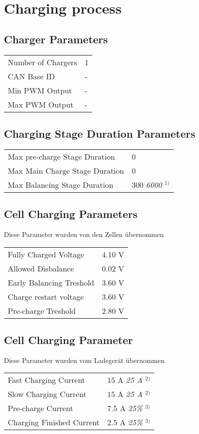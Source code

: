 \section*{Charging process}
\subsection*{Charger Parameters}
\begin{tabular}{p{11cm}p{2cm}}
	Number of Chargers & 1 \\
	CAN Base ID & - \\
	Min PWM Output & - \\
	Max PWM Output & -
\end{tabular}
\subsection*{Charging Stage Duration Parameters}
\begin{tabular}{p{11cm}p{2cm}}
	Max pre-charge Stage Duration & 0 \\
	Max Main Charge Stage Duration & 0 \\
	Max Balancing Stage Duration & 300 \textit{6000 $^{1)}$}
\end{tabular}
\subsection*{Cell Charging Parameters}
Diese Parameter wurden von den Zellen übernommen \cite{lev50}\\
\begin{tabular}{p{11cm}p{2cm}}
	Fully Charged Voltage & $4.10$ V \\
	Allowed Disbalance & $0.02$ V \\
	Early Balancing Treshold & $3.60$ V \\
	Charge restart voltage & $3.60$ V \\
	Pre-charge Treshold & $2.80$ V
\end{tabular}
\subsection*{Cell Charging Parameter}
Diese Parameter wurden vom Ladegerät übernommen \cite{ladegeraet}\\
\begin{tabular}{p{11cm}p{3cm}}
	Fast Charging Current & $15$ A \textit{25 A $^{2)}$}\\
	Slow Charging Current & $15$ A \textit{25 A $^{2)}$}\\
	Pre-charge Current & $7.5$ A \textit{25\% $^{3)}$}\\
	Charging Finished Current & $2.5$ A \textit{25\% $^{3)}$}
\end{tabular}

